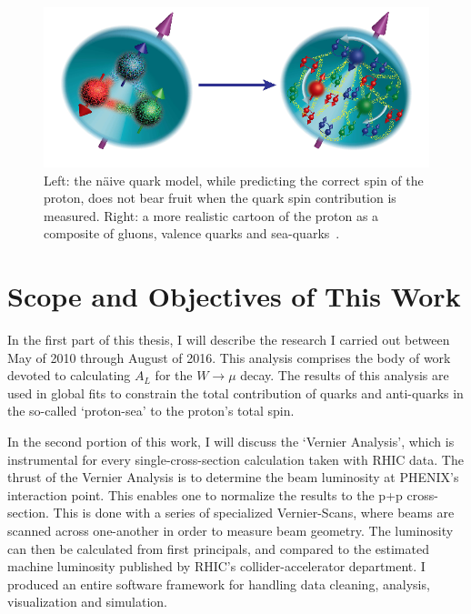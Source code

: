 \begin{figure}
  \centering
  \includegraphics[width=0.8\linewidth]{./figures/figures_introduction_nucleon_picture.png}
  \caption{
    Left: the n{\"a}ive quark model, while predicting the correct spin of the
    proton, does not bear fruit when the quark spin contribution is measured.
    Right: a more realistic cartoon of the proton as a composite of gluons,
    valence quarks and sea-quarks~\cite{Accardi2012}.
  }
  \label{fig:spin_crisis_cartoon}
\end{figure}
 
\section{Scope and Objectives of This Work} 

In the first part of this thesis, I will describe the research I carried out
between May of 2010 through August of 2016.  This analysis comprises the body of
work devoted to calculating $A_L$ for the $W\rightarrow\mu$ decay. The results
of this analysis are used in global fits to constrain the total contribution of
quarks and anti-quarks in the so-called `proton-sea' to the proton's total spin.

In the second portion of this work, I will discuss the `Vernier Analysis', which
is instrumental for every single-cross-section calculation taken with RHIC data.
The thrust of the Vernier Analysis is to determine the beam luminosity at
PHENIX's interaction point. This enables one to normalize the results to the p+p
cross-section. This is done with a series of specialized Vernier-Scans, where
beams are scanned across one-another in order to measure beam geometry. The
luminosity can then be calculated from first principals, and compared to the
estimated machine luminosity published by RHIC's collider-accelerator
department. I produced an entire software framework for handling data cleaning,
analysis, visualization and simulation.
